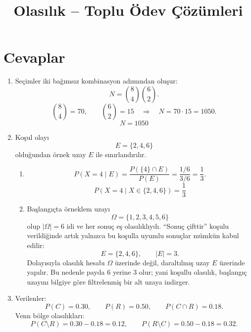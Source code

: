 \documentclass[12pt,a4paper]{article}
\title{\textbf{\color{TitleColor}Olasılık -- Toplu Ödev Çözümleri}}
\author{}
\date{}
\begin{document}
\maketitle

\section*{\textbf{\color{TitleColor}Cevaplar}}

\begin{enumerate}
\item Seçimler iki bağımsız kombinasyon adımından oluşur:
\[
N=\binom{8}{4}\binom{6}{2}.
\]
\[
\binom{8}{4}=70,\qquad \binom{6}{2}=15
\quad \Rightarrow \quad
N=70\cdot 15=1050.
\]
\[
\boxed{N=1050}
\]

\item Koşul olayı
\[
E=\{2,4,6\}
\]
olduğundan örnek uzay $E$ ile sınırlandırılır.
\begin{center}
\end{center}
\begin{enumerate}
\item
\[
P(X=4\mid E)=\frac{P(\{4\}\cap E)}{P(E)}=\frac{1/6}{3/6}=\frac{1}{3}.
\]
\[
\boxed{P(X=4\mid X\in\{2,4,6\})=\frac{1}{3}}
\]
\item Başlangıçta örneklem uzayı
\[
\Omega=\{1,2,3,4,5,6\}
\]
olup $|\Omega|=6$ idi ve her sonuç eş olasılıklıydı. ``Sonuç çifttir'' koşulu verildiğinde artık yalnızca bu koşulla uyumlu sonuçlar mümkün kabul edilir:
\[
E=\{2,4,6\},\qquad |E|=3.
\]
Dolayısıyla olasılık hesabı $\Omega$ üzerinde değil, daraltılmış uzay $E$ üzerinde yapılır. Bu nedenle payda $6$ yerine $3$ olur; yani koşullu olasılık, başlangıç uzayını bilgiye göre filtrelenmiş bir alt uzaya indirger.
\end{enumerate}

\item Verilenler:
\[
P(C)=0.30,\qquad P(R)=0.50,\qquad P(C\cap R)=0.18.
\]
Venn bölge olasılıkları:
\[
P(C\setminus R)=0.30-0.18=0.12,\qquad
P(R\setminus C)=0.50-0.18=0.32.
\]
\begin{center}
\end{center}
\end{enumerate}
\end{document}
